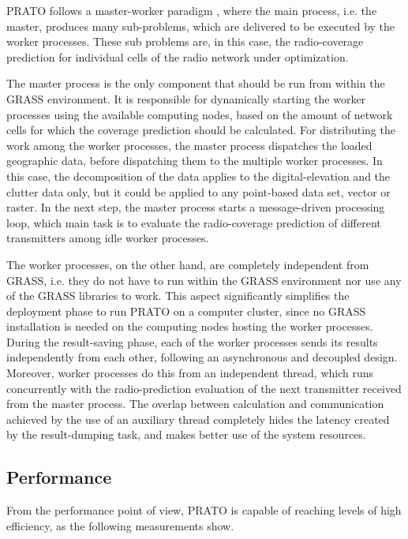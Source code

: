 PRATO follows a master-worker paradigm \cite{Mattson_Patterns_for_parallel_programming:2004},
where the main process, i.e. the master, produces many sub-problems,
which are delivered to be executed by the worker processes. These
sub problems are, in this case, the radio-coverage prediction for
individual cells of the radio network under optimization.

The master process is the only component that should be run from within
the GRASS environment. It is responsible for dynamically starting
the worker processes using the available computing nodes, based on
the amount of network cells for which the coverage prediction should
be calculated. For distributing the work among the worker processes,
the master process dispatches the loaded geographic data, before dispatching
them to the multiple worker processes. In this case, the decomposition
of the data applies to the digital-elevation and the clutter data
only, but it could be applied to any point-based data set, vector
or raster. In the next step, the master process starts a message-driven
processing loop, which main task is to evaluate the radio-coverage
prediction of different transmitters among idle worker processes.

The worker processes, on the other hand, are completely independent
from GRASS, i.e. they do not have to run within the GRASS environment
nor use any of the GRASS libraries to work. This aspect significantly
simplifies the deployment phase to run PRATO on a computer cluster,
since no GRASS installation is needed on the computing nodes hosting
the worker processes. During the result-saving phase, each of the
worker processes sends its results independently from each other,
following an asynchronous and decoupled design. Moreover, worker processes
do this from an independent thread, which runs concurrently with the
radio-prediction evaluation of the next transmitter received from
the master process. The overlap between calculation and communication
achieved by the use of an auxiliary thread completely hides the latency
created by the result-dumping task, and makes better use of the system
resources.


\subsection{Performance}

From the performance point of view, PRATO is capable of reaching levels
of high efficiency, as the following measurements show. 

